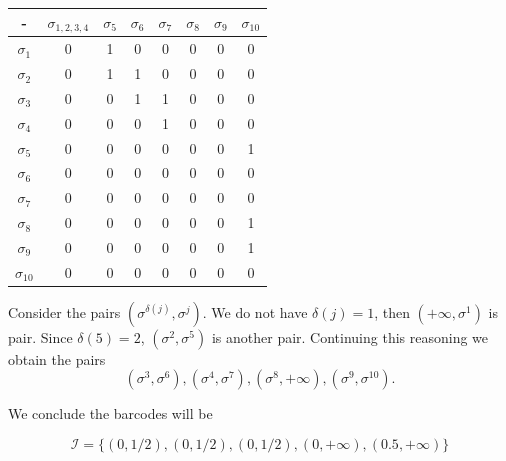 \begin{center}
    \begin{tabular}{|c|c|c|c|c|c|c|c|}
        \hline
        -             & $\sigma_{1,2,3,4}$ & $\sigma_5$ & $\sigma_6$ & $\sigma_7$ & $\sigma_8$ & $\sigma_9$ & $\sigma_{10}$ \\ \hline
        $\sigma_1$    & 0                  & 1          & 0          & 0          & 0          & 0          & 0             \\ \hline
        $\sigma_2$    & 0                  & 1          & 1          & 0          & 0          & 0          & 0             \\ \hline
        $\sigma_3$    & 0                  & 0          & 1          & 1          & 0          & 0          & 0             \\ \hline
        $\sigma_4$    & 0                  & 0          & 0          & 1          & 0          & 0          & 0             \\ \hline
        $\sigma_5$    & 0                  & 0          & 0          & 0          & 0          & 0          & 1             \\ \hline
        $\sigma_6$    & 0                  & 0          & 0          & 0          & 0          & 0          & 0             \\ \hline
        $\sigma_7$    & 0                  & 0          & 0          & 0          & 0          & 0          & 0             \\ \hline
        $\sigma_8$    & 0                  & 0          & 0          & 0          & 0          & 0          & 1             \\ \hline
        $\sigma_9$    & 0                  & 0          & 0          & 0          & 0          & 0          & 1             \\ \hline
        $\sigma_{10}$ & 0                  & 0          & 0          & 0          & 0          & 0          & 0             \\ \hline
        \end{tabular}
\end{center}

Consider the pairs $(\sigma^{\delta(j)}, \sigma^j)$. We do not have $\delta(j)
= 1$, then $(+\infty, \sigma^1)$ is pair. Since $\delta(5) = 2$, $(\sigma^2,
\sigma^5)$ is another pair. Continuing this reasoning we obtain the pairs 
$$(\sigma^3, \sigma^6), (\sigma^4, \sigma^7), (\sigma^8, + \infty), (\sigma^9,
\sigma^{10}).$$  

We conclude the barcodes will be 

$$\mathcal{I} = \{(0, 1/2), (0, 1/2), (0, 1/2), (0, + \infty), (0.5, + \infty)\}$$